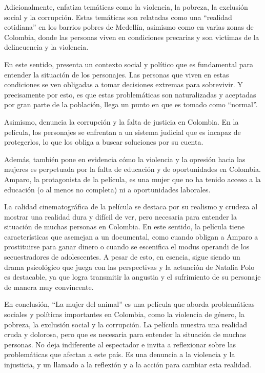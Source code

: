 \documentclass[letterpaper, 12pt]{report}
\begin{document}
Adicionalmente, enfatiza temáticas como la violencia, la
pobreza, la exclusión social y la corrupción. Estas
temáticas son relatadas como una ``realidad cotidiana'' en
los barrios pobres de Medellín, asimismo como en varias
zonas de Colombia, donde las personas viven en condiciones
precarias y son victimas de la delincuencia y la violencia.

En este sentido, presenta un contexto social y político que
es fundamental para entender la situación de los
personajes. Las personas que viven en estas condiciones se
ven obligadas a tomar decisiones extremas para sobrevivir.
Y precisamente por esto, es que estas problemáticas son
naturalizadas y aceptadas por gran parte de la población,
llega un punto en que es tomado como ``normal''.

Asimismo, denuncia la corrupción y la falta de justicia en
Colombia. En la película, los personajes se enfrentan a un
sistema judicial que es incapaz de protegerlos, lo que los
obliga a buscar soluciones por su cuenta.

Además, también pone en evidencia cómo la violencia y la
opresión hacia las mujeres es perpetuada por la falta de
educación y de oportunidades en Colombia. Amparo, la
protagonista de la película, es una mujer que no ha tenido
acceso a la educación (o al menos no completa) ni a
oportunidades laborales.

La calidad cinematográfica de la película se destaca por su
realismo y crudeza al mostrar una realidad dura y difícil
de ver, pero necesaria para entender la situación de muchas
personas en Colombia. En este sentido, la película tiene
características que asemejan a un documental, como cuando
obligan a Amparo a prostituirse para ganar dinero o cuando
se escenifica el modus operandi de los secuestradores de
adolescentes. A pesar de esto, en esencia, sigue siendo un
drama psicológico que juega con las perspectivas y la
actuación de Natalia Polo es destacable, ya que logra
transmitir la angustia y el sufrimiento de su personaje de
manera muy convincente.

En conclusión, ``La mujer del animal'' es una película que
aborda problemáticas sociales y políticas importantes en
Colombia, como la violencia de género, la pobreza, la
exclusión social y la corrupción. La película muestra una
realidad cruda y dolorosa, pero que es necesaria para
entender la situación de muchas personas. No
deja indiferente al espectador e invita a reflexionar
sobre las problemáticas que afectan a este país. 
Es una denuncia a la violencia y la
injusticia, y un llamado a la reflexión y a la
acción para cambiar esta realidad.

\newpage

\printbibliography
\end{document}
